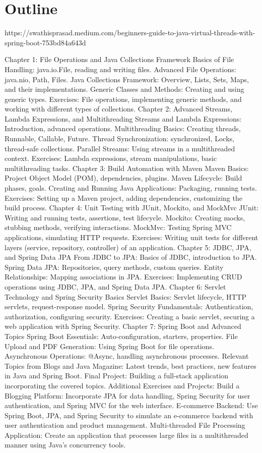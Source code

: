 \chapter{Outline}

https://swathisprasad.medium.com/beginners-guide-to-java-virtual-threads-with-spring-boot-753bd84a643d

Chapter 1: File Operations and Java Collections Framework
Basics of File Handling: java.io.File, reading and writing files.
Advanced File Operations: java.nio, Path, Files.
Java Collections Framework: Overview, Lists, Sets, Maps, and their implementations.
Generic Classes and Methods: Creating and using generic types.
Exercises: File operations, implementing generic methods, and working with different types of collections.
Chapter 2: Advanced Streams, Lambda Expressions, and Multithreading
Streams and Lambda Expressions: Introduction, advanced operations.
Multithreading Basics: Creating threads, Runnable, Callable, Future.
Thread Synchronization: synchronized, Locks, thread-safe collections.
Parallel Streams: Using streams in a multithreaded context.
Exercises: Lambda expressions, stream manipulations, basic multithreading tasks.
Chapter 3: Build Automation with Maven
Maven Basics: Project Object Model (POM), dependencies, plugins.
Maven Lifecycle: Build phases, goals.
Creating and Running Java Applications: Packaging, running tests.
Exercises: Setting up a Maven project, adding dependencies, customizing the build process.
Chapter 4: Unit Testing with JUnit, Mockito, and MockMvc
JUnit: Writing and running tests, assertions, test lifecycle.
Mockito: Creating mocks, stubbing methods, verifying interactions.
MockMvc: Testing Spring MVC applications, simulating HTTP requests.
Exercises: Writing unit tests for different layers (service, repository, controller) of an application.
Chapter 5: JDBC, JPA, and Spring Data JPA
From JDBC to JPA: Basics of JDBC, introduction to JPA.
Spring Data JPA: Repositories, query methods, custom queries.
Entity Relationships: Mapping associations in JPA.
Exercises: Implementing CRUD operations using JDBC, JPA, and Spring Data JPA.
Chapter 6: Servlet Technology and Spring Security Basics
Servlet Basics: Servlet lifecycle, HTTP servlets, request-response model.
Spring Security Fundamentals: Authentication, authorization, configuring security.
Exercises: Creating a basic servlet, securing a web application with Spring Security.
Chapter 7: Spring Boot and Advanced Topics
Spring Boot Essentials: Auto-configuration, starters, properties.
File Upload and PDF Generation: Using Spring Boot for file operations.
Asynchronous Operations: @Async, handling asynchronous processes.
Relevant Topics from Blogs and Java Magazine: Latest trends, best practices, new features in Java and Spring Boot.
Final Project: Building a full-stack application incorporating the covered topics.
Additional Exercises and Projects:
Build a Blogging Platform: Incorporate JPA for data handling, Spring Security for user authentication, and Spring MVC for the web interface.
E-commerce Backend: Use Spring Boot, JPA, and Spring Security to simulate an e-commerce backend with user authentication and product management.
Multi-threaded File Processing Application: Create an application that processes large files in a multithreaded manner using Java's concurrency tools.